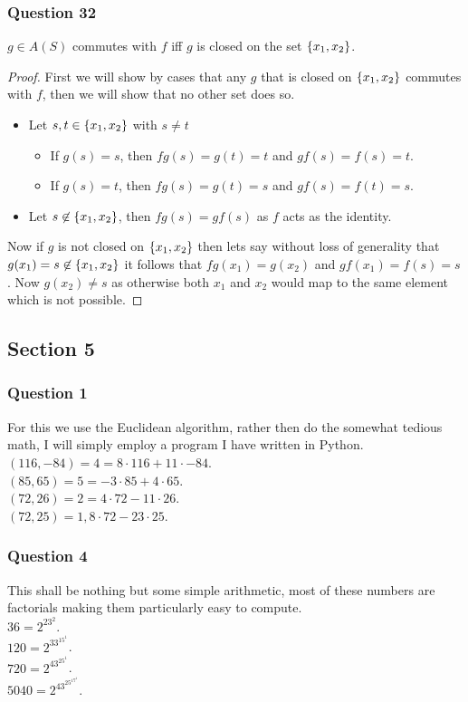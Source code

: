 \documentclass{article}
\begin{document}
\subsubsection{Question 32}
$g\in A(S)$ commutes with $f$ iff $g$ is closed on the set $\left\{ {x_1,x_2} \right\}$.
\begin{proof}
	First we will show by cases that any $g$ that is closed on $\left\{ {x_1,x_2} \right\}$ commutes with $f$, then we will show that no other set does so.
	
	\begin{itemize}
		\item Let $s,t \in \left\{ {x_1,x_2} \right\}$ with $s\not=t$
		\begin{itemize}
			\item If $g(s) = s$, then $fg(s) = g(t) = t$ and $gf(s) = f(s) = t$.
			\item If $g(s) = t$, then $fg(s) = g(t) = s$ and $gf(s) = f(t) = s$.
		\end{itemize}
		\item Let $s \not\in\left\{ {x_1,x_2} \right\}$, then $fg(s) = gf(s)$ as $f$ acts as the identity.
	\end{itemize}
	
	Now if $g$ is not closed on $\left\{ {x_1,x_2} \right\}$ then lets say without loss of generality that $g(x_1) = s \not\in\left\{ {x_1,x_2} \right\}$ it follows that $fg(x_1) = g(x_2)$ and $gf(x_1) = f(s) = s$. Now $g(x_2) \not= s$ as otherwise both $x_1$ and $x_2$ would map to the same element which is not possible.
\end{proof}

\subsection{Section 5}

\subsubsection{Question 1}
For this we use the Euclidean algorithm, rather then do the somewhat tedious math, I will simply employ a program I have written in Python.
\\
 $(116, -84) = 4 = 8 \cdot 116 + 11 \cdot -84$.
\\
 $(85,65)=5=-3\cdot85+4\cdot65$.
\\
 $(72,26)=2=4\cdot72-11\cdot26$.
\\
 $(72,25)=1,8\cdot72-23\cdot25$.

\subsubsection{Question 4}
This shall be nothing but some simple arithmetic, most of these numbers are factorials making them particularly easy to compute.\\
 $36 = 2^23^2$.\\
 $120 = 2^33^15^1$.\\
 $720 = 2^43^25^1$.\\
 $5040 = 2^43^25^17^1$.
\end{document}
